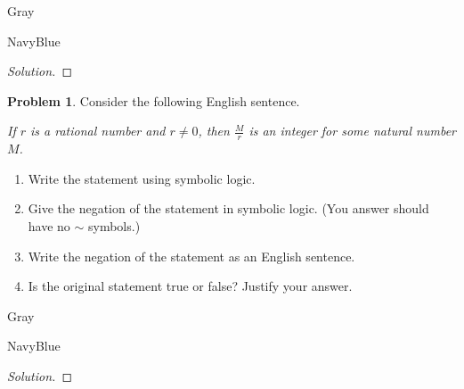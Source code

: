 \documentclass[12pt]{amsart}
\newcounter{problem_number}[section]
\theoremstyle{named}
\newenvironment{soln}
{\begin{color}{Gray}\begin{framed}\begin{color}{NavyBlue}\begin{proof}[Solution]
\doublespacing}
{\end{proof}\end{color}\end{framed}\end{color}}
\theoremstyle{definition}
\newtheorem{problem}{Problem}
\begin{document}
\begin{soln}
	
\end{soln}
\begin{problem}
	Consider the following English sentence.
\begin{center}
	\emph{If $r$ is a rational number and $r\not=0$, then $\frac{M}{r}$ is an integer for some natural number $M$.}
\end{center}

	\begin{enumerate}
		\item Write the statement using symbolic logic.
		\item Give the negation of the statement in symbolic logic. (You answer should have no $\sim$ symbols.)
		\item Write the negation of the statement as an English sentence.
		\item Is the original statement true or false? Justify your answer.
	\end{enumerate}
\end{problem}

\begin{soln}
	
\end{soln}


\end{document}
